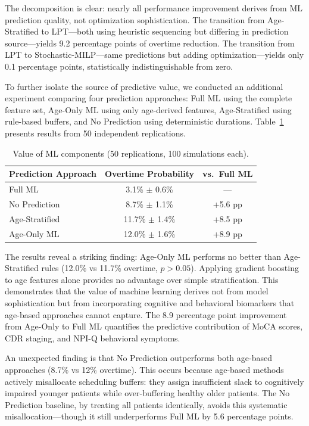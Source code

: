 \documentclass[11pt,a4paper]{article}
\begin{document}
The decomposition is clear: nearly all performance improvement derives from ML prediction quality, not optimization sophistication. The transition from Age-Stratified to LPT---both using heuristic sequencing but differing in prediction source---yields 9.2 percentage points of overtime reduction. The transition from LPT to Stochastic-MILP---same predictions but adding optimization---yields only 0.1 percentage points, statistically indistinguishable from zero.

To further isolate the source of predictive value, we conducted an additional experiment comparing four prediction approaches: Full ML using the complete feature set, Age-Only ML using only age-derived features, Age-Stratified using rule-based buffers, and No Prediction using deterministic durations. Table~\ref{tab:ml_value} presents results from 50 independent replications.

\begin{table}[H]
\centering
\caption{Value of ML components (50 replications, 100 simulations each). }
\label{tab:ml_value}
\begin{tabular}{@{}lcc@{}}
\toprule
\textbf{Prediction Approach} & \textbf{Overtime Probability} & \textbf{vs.\ Full ML} \\
\midrule
Full ML & 3.1\% $\pm$ 0.6\% & --- \\
No Prediction & 8.7\% $\pm$ 1.1\% & +5.6 pp \\
Age-Stratified & 11.7\% $\pm$ 1.4\% & +8.5 pp \\
Age-Only ML & 12.0\% $\pm$ 1.6\% & +8.9 pp \\
\bottomrule
\end{tabular}
\end{table}

The results reveal a striking finding: Age-Only ML performs no better than Age-Stratified rules (12.0\% vs 11.7\% overtime, $p > 0.05$). Applying gradient boosting to age features alone provides no advantage over simple stratification. This demonstrates that the value of machine learning derives not from model sophistication but from incorporating cognitive and behavioral biomarkers that age-based approaches cannot capture. The 8.9 percentage point improvement from Age-Only to Full ML quantifies the predictive contribution of MoCA scores, CDR staging, and NPI-Q behavioral symptoms.

An unexpected finding is that No Prediction outperforms both age-based approaches (8.7\% vs 12\% overtime). This occurs because age-based methods actively misallocate scheduling buffers: they assign insufficient slack to cognitively impaired younger patients while over-buffering healthy older patients. The No Prediction baseline, by treating all patients identically, avoids this systematic misallocation---though it still underperforms Full ML by 5.6 percentage points.
\end{document}
